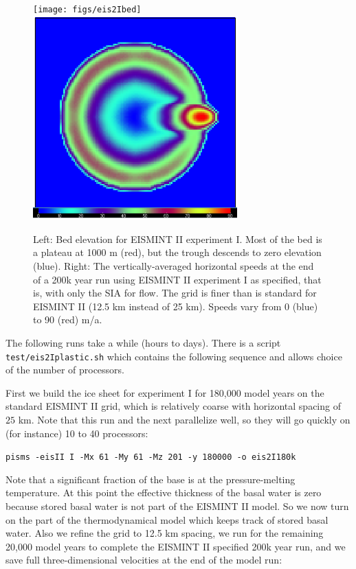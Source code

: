 \documentclass[11pt,final]{amsart}
\begin{document}
\begin{figure}[ht]
\texttt{[image: figs/eis2Ibed]} \includegraphics[height=3.1in,keepaspectratio=true]{figs/cbar_eis2I}
\caption{Left: Bed elevation for EISMINT II experiment I.  Most of the bed is a plateau at 1000 m (red), but the trough descends to zero elevation (blue).  Right: The vertically-averaged horizontal speeds at the end of a 200k year run using EISMINT II experiment I as specified, that is, with only the SIA for flow.  The grid is finer than is standard for EISMINT II (12.5 km instead of 25 km).  Speeds vary from 0 (blue) to 90 (red) m/a.}
\label{fig:eis2I}
\end{figure}

The following runs take a while (hours to days).  There is a script \verb|test/eis2Iplastic.sh| which contains the following sequence and allows choice of the number of processors.

First we build the ice sheet for experiment I for 180,000 model years on the standard EISMINT II grid, which is relatively coarse with horizontal spacing of $25$ km.  Note that this run and the next parallelize well, so they will go quickly on (for instance) 10 to 40 processors:

\verb|pisms -eisII I -Mx 61 -My 61 -Mz 201 -y 180000 -o eis2I180k|

\noindent Note that a significant fraction of the base is at the pressure-melting temperature.   At this point the effective thickness of the basal water is zero because stored basal water is not part of the EISMINT II model.  So we now turn on the part of the thermodynamical model which keeps track of stored basal water.  Also we refine the grid to 12.5 km spacing, we run for the remaining 20,000 model years to complete the EISMINT II specified 200k year run, and we save full three-dimensional velocities at the end of the model run:
\end{document}
